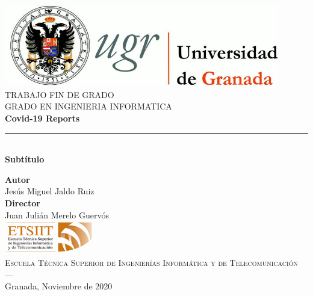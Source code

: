 \begin{titlepage}
\newlength{\centeroffset}
\setlength{\centeroffset}{-0.5\oddsidemargin}
\addtolength{\centeroffset}{0.5\evensidemargin}
\thispagestyle{empty}

\noindent\hspace*{\centeroffset}\begin{minipage}{\textwidth}

\centering
\includegraphics[width=0.9\textwidth]{logos/logo_ugr.jpg}\\[1.4cm]

\textsc{ \Large TRABAJO FIN DE GRADO\\[0.2cm]}
\textsc{ GRADO EN INGENIERIA INFORMATICA}\\[1cm]

{\Huge\bfseries Covid-19 Reports \\}
\noindent\rule[-1ex]{\textwidth}{3pt}\\[3.5ex]
{\large\bfseries Subtítulo }
\end{minipage}

\vspace{2.5cm}
\noindent\hspace*{\centeroffset}
\begin{minipage}{\textwidth}
\centering

\textbf{Autor}\\ {Jesús Miguel Jaldo Ruiz}\\[2.5ex]
\textbf{Director}\\ {Juan Julián Merelo Guervós}\\[2cm]
\includegraphics[width=0.3\textwidth]{logos/etsiit_logo.png}\\[0.1cm]
\textsc{Escuela Técnica Superior de Ingenierías Informática y de Telecomunicación}\\
\textsc{---}\\
Granada, Noviembre de 2020
\end{minipage}
\end{titlepage}
